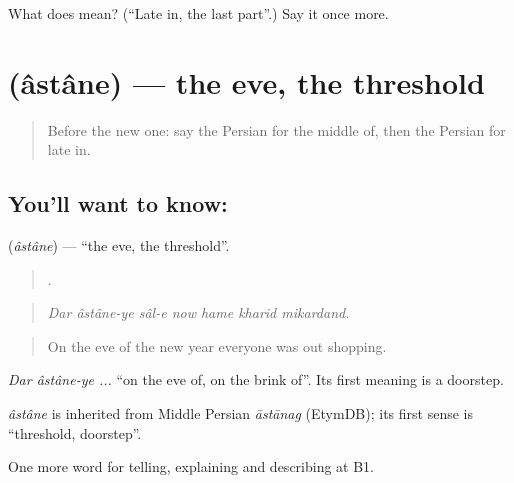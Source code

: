 \begin{tcolorbox}[breakable,colback=teal!4,colframe=teal!35!black,title={Before you move on}]
What does  mean? (\textquotedblleft{}Late in, the last part\textquotedblright{}.) Say it once more.
\end{tcolorbox}
\section[\texorpdfstring{\fa{آستانه} (âstâne)}{آستانه (âstâne)}]{ (âstâne) — the eve, the threshold}

\label{lesson:FA-C307-astane}



\begin{quote}
Before the new one: say the Persian for the middle of, then the Persian for late in.
\end{quote}

\subsection*{You'll want to know: }
\textbf{} (\emph{âstâne}) — \textquotedblleft{}the eve, the threshold\textquotedblright{}.

\begin{quote}
      .
\end{quote}

\begin{quote}
\emph{Dar âstâne-ye sâl-e now hame kharid mikardand.}
\end{quote}

\begin{quote}
On the eve of the new year everyone was out shopping.
\end{quote}

\emph{Dar âstâne-ye ...} \textquotedblleft{}on the eve of, on the brink of\textquotedblright{}. Its first meaning is a doorstep.

\begin{cousinweb}
\emph{âstâne} is inherited from Middle Persian \emph{āstānag} (EtymDB); its first sense is \textquotedblleft{}threshold, doorstep\textquotedblright{}.
\end{cousinweb}

\begin{grammarlens}[title={What you've built}]
One more word for telling, explaining and describing at B1.
\end{grammarlens}

